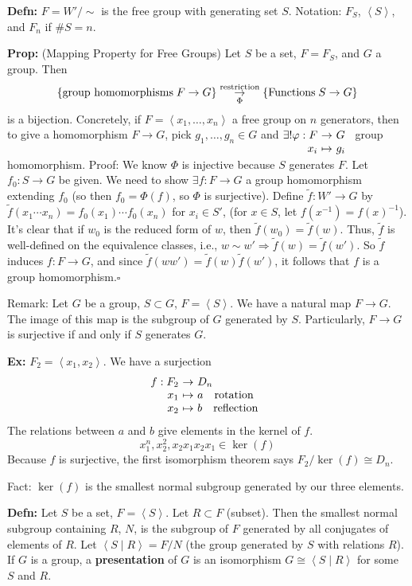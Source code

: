 \documentclass[10pt,letterpaper]{article}
\newcommand{\n}{\hfill\break}
\newcommand{\hangblock}[2]{\par\noindent\settowidth{\hangindent}{\textbf{#1: }}\textbf{#1: }\!\!\!#2}
\newcommand{\defn}[1]{\hangblock{Defn}{#1}}
\newcommand{\prop}[1]{\hangblock{Prop}{#1}}
\newcommand{\ex}[1]{\hangblock{Ex}{#1}}
\newcommand{\proven}{\;$\square$\n}
\newcommand{\ptxt}[1]{\textrm{\textnormal{#1}}}
\newcommand{\set}[1]{\left\{#1\right\}}
\newcommand{\inv}{^{-1}}
\newcommand{\map}[4]{\!\!\!\begin{array}[t]{rcl}#1 & \!\!\!\!\to & \!\!\!\!#2\\ #3 & \!\!\!\!\mapsto & \!\!\!\!#4\end{array}}
\newcommand{\generated}[1]{\left<#1\right>}
\newcommand{\unique}{!}
\begin{document}
\defn{
	$F=W'/\sim$ is the free group with generating set $S$.\n
	Notation: $F_{S}$, $\generated{S}$, and $F_{n}$ if $\#S=n$.\n
}

\prop{
	(Mapping Property for Free Groups) Let $S$ be a set, $F=F_{S}$, and $G$ a group. Then
	\[
		\set{\ptxt{group homomorphisms}\;F\to{}G}\underset{\Phi}{\overset{\ptxt{restriction}}{\to}}\set{\ptxt{Functions}\;S\to{}G}
	\]
	is a bijection. Concretely, if $F=\generated{x_{1},\ldots,x_{n}}$ a free group on $n$ generators, then to give a homomorphism $F\to{}G$, pick $g_{1},\ldots,g_{n}\in{}G$ and $\exists\unique\map{\varphi:F}{G}{x_{i}}{g_{i}}$ group homomorphism.\n
	Proof: We know $\Phi$ is injective because $S$ generates $F$. Let $f_{0}:S\to{}G$ be given. We need to show $\exists{}f:F\to{}G$ a group homomorphism extending $f_{0}$ (so then $f_{0}=\Phi(f)$, so $\Phi$ is surjective).\n
	Define $\tilde{f}:W'\to{}G$ by $\tilde{f}(x_{1}\cdots{}x_{n})=f_{0}(x_{1})\cdots{}f_{0}(x_{n})$ for $x_{i}\in{}S'$, (for $x\in{}S$, let $f(x\inv)=f(x)\inv$). It's clear that if $w_{0}$ is the reduced form of $w$, then $\tilde{f}(w_{0})=\tilde{f}(w)$. Thus, $\tilde{f}$ is well-defined on the equivalence classes, i.e., $w\sim{}w'\Rightarrow{}\tilde{f}(w)=\tilde{f}(w')$. So $\tilde{f}$ induces $f:F\to{}G$, and since $\tilde{f}(ww')=\tilde{f}(w)\tilde{f}(w')$, it follows that $f$ is a group homomorphism.\proven
}

\par\noindent
Remark: Let $G$ be a group, $S\subset{}G$, $F=\generated{S}$. We have a natural map $F\to{}G$. The image of this map is the subgroup of $G$ generated by $S$. Particularly, $F\to{}G$ is surjective if and only if $S$ generates $G$.\n

\ex{
	$F_{2}=\generated{x_{1},x_{2}}$. We have a surjection
	\[
		\map{f:F_{2}}{D_{n}}{x_{1}}{a\quad\ptxt{rotation}\\ x_{2} & \!\!\!\!\mapsto & \!\!\!\!b\quad\ptxt{reflection}}
	\]
	The relations between $a$ and $b$ give elements in the kernel of $f$.
	\[
		x_{1}^{n},x_{2}^{2},x_{2}x_{1}x_{2}x_{1}\in\ker(f)
	\]
	Because $f$ is surjective, the first isomorphism theorem says $F_{2}/\ker(f)\cong{}D_{n}$.\n
}

\par\noindent
Fact: $\ker(f)$ is the smallest normal subgroup generated by our three elements.\n

\defn{
	Let $S$ be a set, $F=\generated{S}$. Let $R\subset{}F$ (subset). Then the smallest normal subgroup containing $R$, $N$, is the subgroup of $F$ generated by all conjugates of elements of $R$. Let $\generated{S\;|\;R}=F/N$ (the group generated by $S$ with relations $R$). If $G$ is a group, a \textbf{presentation} of $G$ is an isomorphism $G\cong\generated{S\;|\;R}$ for some $S$ and $R$.\n
}
\end{document}
